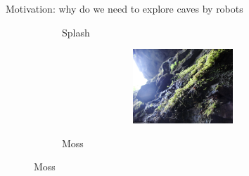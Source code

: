 \documentclass[aspectratio=169]{beamer}
\begin{document}
\begin{frame}[t]{Motivation: why do we need to explore caves by robots}
\begin{figure}[H]
\begin{subfigure}[b]{0.3\textwidth}
            \caption*{Splash}
            \label{fig:surface_types/splash.png}
        \end{subfigure}
        \hfill
        \begin{subfigure}[b]{0.3\textwidth}
            \centering\includegraphics[height=2.8cm,width=1\textwidth,keepaspectratio]{surface_types/moss.jpg}\\
            \caption*{Moss}
            \label{fig:moss}
        \end{subfigure}
    \end{figure}
\end{frame}
\end{document}
